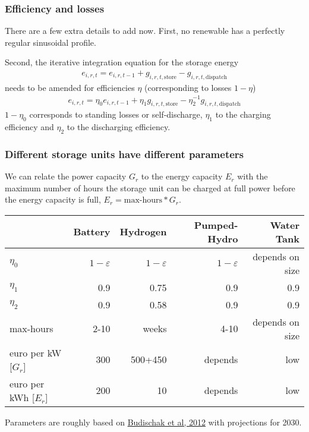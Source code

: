 \documentclass[10pt,aspectratio=169,dvipsnames]{beamer}
\newcommand{\ra}[1]{\renewcommand{\arraystretch}{#1}}
\begin{document}
\begin{frame}
  \frametitle{Efficiency and losses}

  There are a few extra details to add now. First, no renewable has a perfectly regular sinusoidal profile.

  Second, the iterative integration equation for the storage energy
  \begin{align*}
    e_{i,r,t} = e_{i,r,t-1} + g_{i,r,t,\textrm{store}} -  g_{i,r,t,\textrm{dispatch}}
  \end{align*}
  needs to be amended for \alert{efficiencies} $\eta$ (corresponding to \alert{losses} $1-\eta$)
  \begin{align*}
    e_{i,r,t} = \eta_0e_{i,r,t-1} + \eta_1g_{i,r,t,\textrm{store}} -  \eta_2^{-1} g_{i,r,t,\textrm{dispatch}}
  \end{align*}
  $1-\eta_0$ corresponds to \alert{standing losses} or \alert{self-discharge}, $\eta_1$ to the \alert{charging efficiency} and $\eta_2$ to the \alert{discharging efficiency}.

\end{frame}


\begin{frame}
  \frametitle{Different storage units have different parameters}

  We can relate the power capacity $G_r$ to the energy capacity $E_r$
  with the maximum number of hours the storage unit can be charged at full
power before the energy capacity is full, $E_r =
  \textrm{max-hours}*G_r$.

  \ra{1.05}
  \begin{table}[!t]
    \begin{tabular}{lrrrr}
      \toprule
      & Battery & Hydrogen & Pumped-Hydro & Water Tank\\
      \midrule
      $\eta_0$ & $1-\varepsilon$ & $1-\varepsilon$ & $1-\varepsilon$ & depends on size  \\
      $\eta_1$ & 0.9 & 0.75 & 0.9 & 0.9 \\
      $\eta_2$ & 0.9 & 0.58 & 0.9 & 0.9 \\
      max-hours & 2-10 & weeks & 4-10 & depends on size \\
      euro per kW [$G_r$] &300 &500+450 & depends& low \\
      euro per kWh [$E_r$] &200 & 10 &depends&low \\
      \bottomrule
    \end{tabular}
  \end{table}
Parameters are roughly based on
\href{http://www.sciencedirect.com/science/article/pii/S0378775312014759}{Budischak
  et al, 2012} with projections for 2030.


\end{frame}
\end{document}
